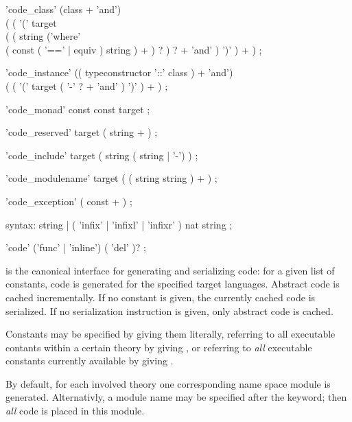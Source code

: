 \begin{isabellebody}
\begin{isamarkuptext}
\begin{rail}
    'code\_class' (class + 'and') \\
      ( ( '(' target \\
        ( ( string ('where' \\
          ( const ( '==' | equiv ) string ) + ) ? ) ? + 'and' ) ')' ) + )
    ;

    'code\_instance' (( typeconstructor '::' class ) + 'and') \\
      ( ( '(' target ( '-' ? + 'and' ) ')' ) + )
    ;

    'code\_monad' const const target
    ;

    'code\_reserved' target ( string + )
    ;

    'code\_include' target ( string ( string | '-') )
    ;

    'code\_modulename' target ( ( string string ) + )
    ;

    'code\_exception' ( const + )
    ;

    syntax: string | ( 'infix' | 'infixl' | 'infixr' ) nat string
    ;

    'code' ('func' | 'inline') ( 'del' )?
    ;
  \end{rail}

  \begin{descr}

  \item [\hyperlink{command.HOL.export-code}{\mbox{\isa{\isacommand{export{\isacharunderscore}code}}}}] is the canonical interface
  for generating and serializing code: for a given list of constants,
  code is generated for the specified target languages.  Abstract code
  is cached incrementally.  If no constant is given, the currently
  cached code is serialized.  If no serialization instruction is
  given, only abstract code is cached.

  Constants may be specified by giving them literally, referring to
  all executable contants within a certain theory by giving , or referring to \emph{all} executable constants currently
  available by giving \isa{{\isachardoublequote}{\isacharasterisk}{\isachardoublequote}}.

  By default, for each involved theory one corresponding name space
  module is generated.  Alternativly, a module name may be specified
  after the \hyperlink{keyword.module-name}{\mbox{}} keyword; then \emph{all} code is
  placed in this module.


\end{descr}
\end{isamarkuptext}
\end{isabellebody}
